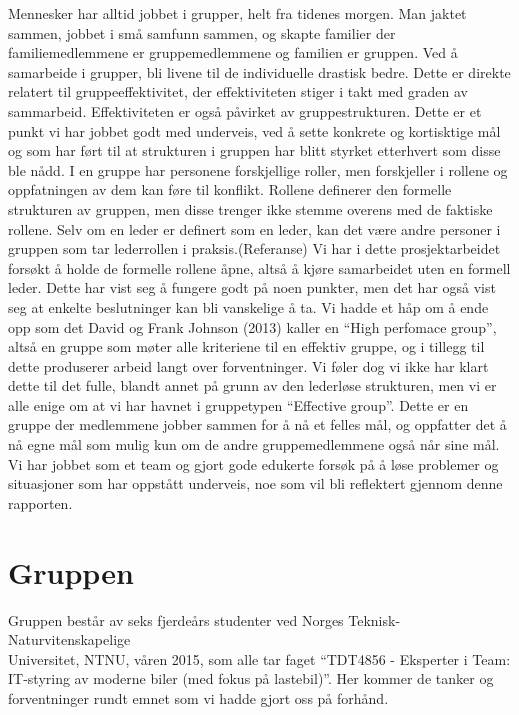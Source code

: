 Mennesker har alltid jobbet i grupper, helt fra tidenes morgen. Man jaktet sammen, jobbet i små samfunn sammen, og skapte familier der familiemedlemmene er gruppemedlemmene og familien er gruppen. Ved å samarbeide i grupper, bli livene til de individuelle drastisk bedre. Dette er direkte relatert til gruppeeffektivitet, der effektiviteten stiger i takt med graden av sammarbeid. Effektiviteten er også påvirket av gruppestrukturen. Dette er et punkt vi har jobbet godt med underveis, ved å sette konkrete og kortisktige mål og som har ført til at strukturen i gruppen har blitt styrket etterhvert som disse ble nådd. I en gruppe har personene forskjellige roller, men forskjeller i rollene og oppfatningen av dem kan føre til konflikt. Rollene definerer den formelle strukturen av gruppen, men disse trenger ikke stemme overens med de faktiske rollene. Selv om en leder er definert som en leder, kan det være andre personer i gruppen som tar lederrollen i praksis.(Referanse) Vi har i dette prosjektarbeidet forsøkt å holde de formelle rollene åpne, altså å kjøre samarbeidet uten en formell leder. Dette har vist seg å fungere godt på noen punkter, men det har også vist seg at enkelte beslutninger kan bli vanskelige å ta. Vi hadde et håp om å ende opp som det David og Frank Johnson (2013) kaller en “High perfomace group”, altså en gruppe som møter alle kriteriene til en effektiv gruppe, og i tillegg til dette produserer arbeid langt over forventninger. Vi føler dog vi ikke har klart dette til det fulle, blandt annet på grunn av den lederløse strukturen, men vi er alle enige om at vi har havnet i gruppetypen “Effective group”. Dette er en gruppe der medlemmene jobber sammen for å nå et felles mål, og oppfatter det å nå egne mål som mulig kun om de andre gruppemedlemmene også når sine mål. \cite{Artikkel2} Vi har jobbet som et team og gjort gode edukerte forsøk på å løse problemer og situasjoner som har oppstått underveis, noe som vil bli reflektert gjennom denne rapporten.

\chapter{Gruppen} 
Gruppen består av seks fjerdeårs studenter ved Norges Teknisk-
Naturvitenskapelige\\Universitet, NTNU, våren 2015, som alle tar faget ``TDT4856 
- Eksperter i Team: IT-styring av moderne biler (med fokus på lastebil)''.	 Her kommer de tanker og forventninger
rundt emnet som vi hadde gjort oss på forhånd.

